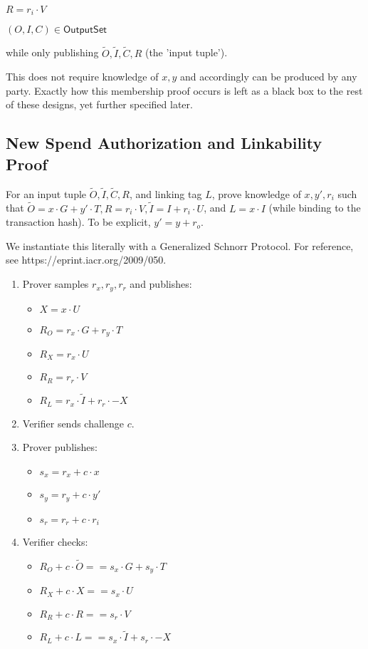 \documentclass[]{article}
\begin{document}
$R = r_i \cdot V$

$(O, I, C) \in \mathsf{OutputSet}$

while only publishing $\tilde{O}, \tilde{I}, \tilde{C}, R$ (the 'input tuple').

This does not require knowledge of $x, y$ and accordingly can be produced by any party. Exactly how this membership proof occurs is left as a black box to the rest of these designs, yet further specified later.

\subsection{New Spend Authorization and Linkability Proof}

For an input tuple $\tilde{O}, \tilde{I}, \tilde{C}, R$, and linking tag $L$, prove knowledge of $x, y', r_i$ such that $\tilde{O} = x \cdot G + y' \cdot T, R = r_i \cdot V, \tilde{I} = I + r_i \cdot U$, and $L = x \cdot I$ (while binding to the transaction hash). To be explicit, $y' = y + r_o$.

We instantiate this literally with a Generalized Schnorr Protocol. 
For reference, see https://eprint.iacr.org/2009/050.

\begin{enumerate}
	\item
	Prover samples $r_x, r_y, r_r$ and publishes:
	\begin{itemize}
		\item
		$X = x \cdot U$	
		\item
		$R_O = r_x \cdot G + r_y \cdot T$
		\item
		$R_X = r_x \cdot U$
		\item
		$R_R = r_r \cdot V$
		\item
		$R_L = r_x \cdot \tilde{I} + r_r \cdot -X$
	\end{itemize}
	\item
	Verifier sends challenge $c$.
	\item
	Prover publishes:
	\begin{itemize}
		\item
		$s_x = r_x + c \cdot x$	
		\item
		$s_y = r_y + c \cdot y'$
		\item
		$s_r = r_r + c \cdot r_i$
	\end{itemize}
	\item
	Verifier checks:
	\begin{itemize}
		\item
		$R_O + c \cdot \tilde{O} == s_x \cdot G + s_y \cdot T$
		\item
		$R_X + c \cdot X == s_x \cdot U$
		\item
		$R_R + c \cdot R == s_r \cdot V$
		\item
		$R_L + c \cdot L == s_x \cdot \tilde{I} + s_r \cdot -X$
	\end{itemize}
\end{enumerate}
\end{document}
